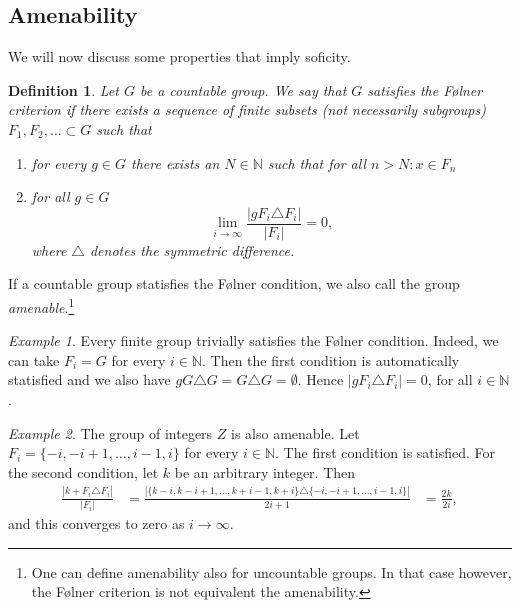 \documentclass[titlepage, a4paper]{article}
\newcommand{\N}{\mathbb{N}}
\newcommand{\card}[1]{\left| #1 \right|}
\newtheorem{definition}{Definition}
\theoremstyle{remark}
\newtheorem{example}{Example}
\begin{document}



    \subsection{Amenability}

    We will now discuss some properties that imply soficity.



    \begin{definition}\cite{noauthor_folner_2019} \label{def:folner}
        Let $G$ be a countable group. We say that $G$ satisfies the Følner criterion if there exists a sequence of finite subsets (not necessarily subgroups) $F_1, F_2, \dots \subset G$ such that 
        \begin{enumerate}
            \item for every $g \in G$ there exists an $N \in \N$ such that for all $n > N: x \in F_n$
            \item for all $g \in G$ 
            \[\lim_{i\to \infty} \frac{\card{gF_i \triangle F_i}}{\card{F_i}} = 0, \]
            where $\triangle$ denotes the symmetric difference.
        \end{enumerate}
    \end{definition}

If a countable group statisfies the Følner condition, we also call the group \emph{amenable}.\footnote{One can define amenability also for uncountable groups. In that case however, the Følner criterion is not equivalent the amenability.}

\begin{example}
    Every finite group trivially satisfies the Følner condition. Indeed, we can take $F_i = G$ for every $i \in \N$. Then the first condition is automatically statisfied and we also have $gG \triangle G = G \triangle G = \emptyset$. Hence $\card{gF_i\triangle F_i} = 0$, for all $i \in \N$.
\end{example}

\begin{example}
    The group of integers $Z$ is also amenable. Let $F_i = \{-i, -i+1, \dots, i-1, i\}$ for every $i \in \N$. The first condition is satisfied. For the second condition, let $k$ be an arbitrary integer. Then
    \begin{align*}
        \frac{\card{k + F_i \triangle F_i}}{\card{F_i}}
        &= \frac{\card{\{k-i, k-i+1, \dots, k+i-1, k+i\}\triangle \{-i, -i+1, \dots, i-1, i\}}}{2i+1}
        &= \frac{2k}{2i},
    \end{align*}
    and this converges to zero as $i \to \infty$.
\end{example}
\end{document}
